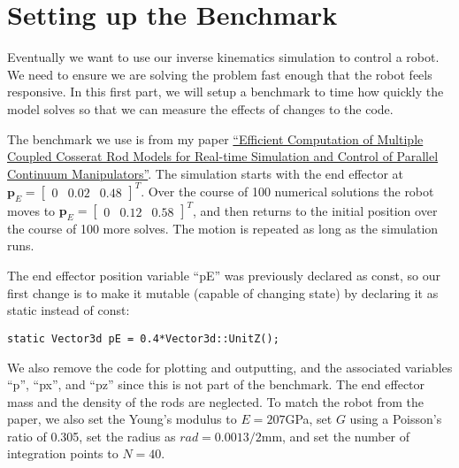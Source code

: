\documentclass[12pt]{article}
\begin{document}
\makeatletter
\renewcommand{\@maketitle}{
\newpage
\null
\vskip 2em
\begin{center}
{\LARGE \@title \par}
\end{center}
\par
} \makeatother

\maketitle

\section{Setting up the Benchmark}

Eventually we want to use our inverse kinematics simulation to control a robot. We need to ensure we are solving the problem fast enough that the robot feels responsive. In this first part, we will setup a benchmark to time how quickly the model solves so that we can measure the effects of changes to the code.

The benchmark we use is from my paper \href{https://ieeexplore.ieee.org/document/7139904}{``Efficient Computation of Multiple Coupled Cosserat Rod Models for Real-time Simulation and Control of Parallel Continuum Manipulators''}. The simulation starts with the end effector at $\boldsymbol{p}_E = \begin{bmatrix} 0 & 0.02 & 0.48 \end{bmatrix}^T$. Over the course of 100 numerical solutions the robot moves to $\boldsymbol{p}_E = \begin{bmatrix} 0 & 0.12 & 0.58 \end{bmatrix}^T$, and then returns to the initial position over the course of 100 more solves. The motion is repeated as long as the simulation runs.

The end effector position variable ``pE'' was previously declared as const, so our first change is to make it mutable (capable of changing state) by declaring it as static instead of const:
\begin{lstlisting}
static Vector3d pE = 0.4*Vector3d::UnitZ();
\end{lstlisting}
We also remove the code for plotting and outputting, and the associated variables ``p'', ``px'', and ``pz'' since this is not part of the benchmark. The end effector mass and the density of the rods are neglected. To match the robot from the paper, we also set the Young's modulus to $E=207$GPa, set $G$ using a Poisson’s ratio of 0.305, set the radius as $rad=0.0013/2$mm, and set the number of integration points to $N=40$.
\end{document}
